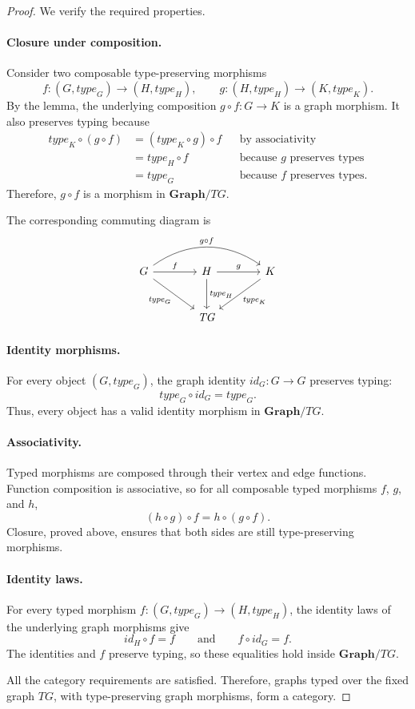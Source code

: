 \documentclass[10pt,a4paper]{article}
\theoremstyle{definition}
\newcommand{\Graph}{\mathbf{Graph}}
\newcommand{\TG}{\mathit{TG}}
\newcommand{\type}{\mathit{type}}
\newcommand{\id}{\mathit{id}}
\begin{document}
\begin{proof}
We verify the required properties.

\paragraph{Closure under composition.}
Consider two composable type-preserving morphisms
\[
 f:(G,\type_G)\to(H,\type_H),
 \qquad
 g:(H,\type_H)\to(K,\type_K).
\]
By the lemma, the underlying composition $g\circ f:G\to K$ is a graph
morphism. It also preserves typing because
\begin{align*}
 \type_K\circ(g\circ f)
 &=(\type_K\circ g)\circ f
 &&\text{by associativity}\\
 &=\type_H\circ f
 &&\text{because $g$ preserves types}\\
 &=\type_G
 &&\text{because $f$ preserves types}.
\end{align*}
Therefore, $g\circ f$ is a morphism in $\Graph/\TG$.

The corresponding commuting diagram is
\[
\begin{tikzcd}[column sep=large,row sep=large]
G \arrow[r,"f"] \arrow[rr,bend left=35,"g\circ f"]
  \arrow[dr,swap,"\type_G"]
& H \arrow[r,"g"] \arrow[d,"\type_H"]
& K \arrow[dl,"\type_K"] \\
& \TG &
\end{tikzcd}
\]

\paragraph{Identity morphisms.}
For every object $(G,\type_G)$, the graph identity
$\id_G:G\to G$ preserves typing:
\[
    \type_G\circ\id_G=\type_G.
\]
Thus, every object has a valid identity morphism in $\Graph/\TG$.

\paragraph{Associativity.}
Typed morphisms are composed through their vertex and edge functions. Function
composition is associative, so for all composable typed morphisms $f$, $g$,
and $h$,
\[
    (h\circ g)\circ f=h\circ(g\circ f).
\]
Closure, proved above, ensures that both sides are still type-preserving
morphisms.

\paragraph{Identity laws.}
For every typed morphism
$f:(G,\type_G)\to(H,\type_H)$, the identity laws of the underlying graph
morphisms give
\[
    \id_H\circ f=f
    \qquad\text{and}\qquad
    f\circ\id_G=f.
\]
The identities and $f$ preserve typing, so these equalities hold inside
$\Graph/\TG$.

All the category requirements are satisfied. Therefore, graphs typed over the
fixed graph $\TG$, with type-preserving graph morphisms, form a category.
\end{proof}
\end{document}
